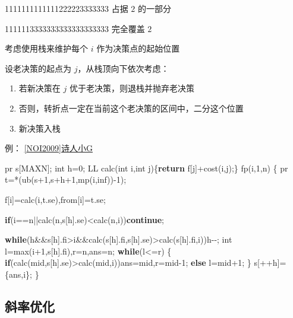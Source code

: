 \documentclass[
]{article}
\newenvironment{Shaded}{}{}
\newcommand{\ControlFlowTok}[1]{\textcolor[rgb]{0.00,0.44,0.13}{\textbf{#1}}}
\newcommand{\DataTypeTok}[1]{\textcolor[rgb]{0.56,0.13,0.00}{#1}}
\newcommand{\DecValTok}[1]{\textcolor[rgb]{0.25,0.63,0.44}{#1}}
\newcommand{\NormalTok}[1]{#1}
\begin{document}
1111111111111222223333333 占据 \(2\) 的一部分

1111113333333333333333333 完全覆盖 \(2\)

考虑使用栈来维护每个 \(i\) 作为决策点的起始位置

设老决策的起点为 \(j\)，从栈顶向下依次考虑：

\begin{enumerate}
\def\labelenumi{\arabic{enumi}.}
\item
  若新决策在 \(j\) 优于老决策，则退栈并抛弃老决策
\item
  否则，转折点一定在当前这个老决策的区间中，二分这个位置
\item
  新决策入栈
\end{enumerate}

例： \href{https://www.luogu.com.cn/problem/P1912}{{[}NOI2009{]}诗人小G}

\begin{Shaded}
\begin{Highlighting}[]
\NormalTok{pr s[MAXN]; }\DataTypeTok{int}\NormalTok{ h=}\DecValTok{0}\NormalTok{;}
\NormalTok{LL calc(}\DataTypeTok{int}\NormalTok{ i,}\DataTypeTok{int}\NormalTok{ j)\{}\ControlFlowTok{return}\NormalTok{ f[j]+cost(i,j);\}}
\NormalTok{fp(i,}\DecValTok{1}\NormalTok{,n)}
\NormalTok{\{}
\NormalTok{    pr t=*(ub(s+}\DecValTok{1}\NormalTok{,s+h+}\DecValTok{1}\NormalTok{,mp(i,inf)){-}}\DecValTok{1}\NormalTok{);}

\NormalTok{    f[i]=calc(i,t.se),from[i]=t.se;}
    
    \ControlFlowTok{if}\NormalTok{(i==n||calc(n,s[h].se)\textless{}calc(n,i))}\ControlFlowTok{continue}\NormalTok{;}

    \ControlFlowTok{while}\NormalTok{(h\&\&s[h].fi\textgreater{}i\&\&calc(s[h].fi,s[h].se)\textgreater{}calc(s[h].fi,i))h{-}{-};}
    \DataTypeTok{int}\NormalTok{ l=max(i+}\DecValTok{1}\NormalTok{,s[h].fi),r=n,ans=n;}
    \ControlFlowTok{while}\NormalTok{(l\textless{}=r)}
\NormalTok{    \{}
        \ControlFlowTok{if}\NormalTok{(calc(mid,s[h].se)\textgreater{}calc(mid,i))ans=mid,r=mid{-}}\DecValTok{1}\NormalTok{;}
        \ControlFlowTok{else}\NormalTok{ l=mid+}\DecValTok{1}\NormalTok{; }
\NormalTok{    \}}
\NormalTok{    s[++h]=\{ans,i\};}
\NormalTok{\}}
\end{Highlighting}
\end{Shaded}

\hypertarget{ux659cux7387ux4f18ux5316}{%
\subsection{斜率优化}\label{ux659cux7387ux4f18ux5316}}
\end{document}
